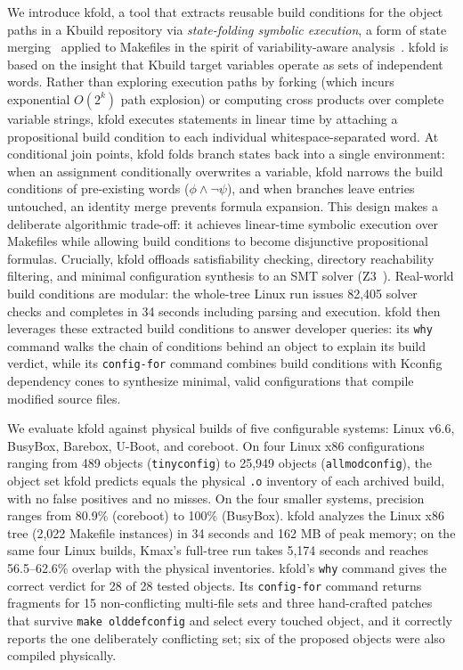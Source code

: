 \documentclass[acmsmall]{acmart}
\newcommand{\tool}{\textsf{kfold}\xspace}
\newcommand{\kmax}{\textsf{Kmax}\xspace}
\begin{document}
We introduce \tool, a tool that extracts reusable build conditions for the object paths in a Kbuild repository via \emph{state-folding symbolic execution}, a form of state merging~\cite{kuznetsov2012efficient,torlak2014symbolic} applied to Makefiles in the spirit of variability-aware analysis~\cite{liebig2011variability,thum2014potential}.
\tool is based on the insight that Kbuild target variables operate as sets of independent words.
Rather than exploring execution paths by forking (which incurs exponential $O(2^k)$ path explosion) or computing cross products over complete variable strings, \tool executes statements in linear time by attaching a propositional build condition to each individual whitespace-separated word.
At conditional join points, \tool folds branch states back into a single environment: when an assignment conditionally overwrites a variable, \tool narrows the build conditions of pre-existing words ($\phi \land \neg \psi$), and when branches leave entries untouched, an identity merge prevents formula expansion.
This design makes a deliberate algorithmic trade-off: it achieves linear-time symbolic execution over Makefiles while allowing build conditions to become disjunctive propositional formulas.
Crucially, \tool offloads satisfiability checking, directory reachability filtering, and minimal configuration synthesis to an SMT solver (\textsc{Z3}~\cite{de2008z3}).
Real-world build conditions are modular: the whole-tree Linux run issues 82,405 solver checks and completes in 34 seconds including parsing and execution.
\tool then leverages these extracted build conditions to answer developer queries: its \texttt{why} command walks the chain of conditions behind an object to explain its build verdict, while its \texttt{config-for} command combines build conditions with Kconfig dependency cones to synthesize minimal, valid configurations that compile modified source files.

We evaluate \tool against physical builds of five configurable systems: Linux v6.6, BusyBox, Barebox, U-Boot, and coreboot.
On four Linux x86 configurations ranging from 489 objects (\texttt{tinyconfig}) to 25,949 objects (\texttt{allmodconfig}), the object set \tool predicts equals the physical \texttt{.o} inventory of each archived build, with no false positives and no misses.
On the four smaller systems, precision ranges from 80.9\% (coreboot) to 100\% (BusyBox).
\tool analyzes the Linux x86 tree (2,022 Makefile instances) in 34 seconds and 162 MB of peak memory; on the same four Linux builds, \kmax's full-tree run takes 5,174 seconds and reaches 56.5--62.6\% overlap with the physical inventories.
\tool's \texttt{why} command gives the correct verdict for 28 of 28 tested objects.
Its \texttt{config-for} command returns fragments for 15 non-conflicting multi-file sets and three hand-crafted patches that survive \texttt{make olddefconfig} and select every touched object, and it correctly reports the one deliberately conflicting set; six of the proposed objects were also compiled physically.
\end{document}
